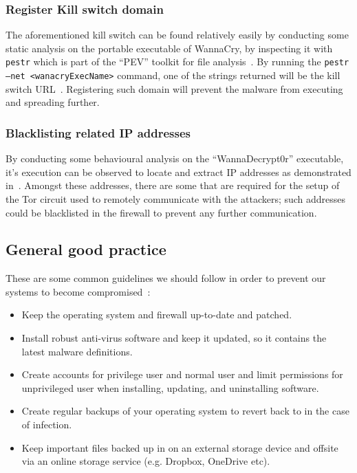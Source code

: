 \documentclass[10pt,a4paper]{article}
\begin{document}
\subsubsection{Register Kill switch domain}
The aforementioned kill switch can be found relatively easily by conducting some static analysis on the portable executable of WannaCry, by inspecting it with \texttt{pestr} which is part of the ``PEV'' toolkit for file analysis~\cite{PEtoolkit}. By running the \texttt{pestr --net <wanacryExecName>} command, one of the strings returned will be the kill switch URL~\cite{pestrVideo}. Registering such domain will prevent the malware from executing and spreading further.

\subsubsection{Blacklisting related IP addresses}
By conducting some behavioural analysis on the ``WannaDecrypt0r'' executable, it's execution can be observed to locate and extract IP addresses as demonstrated in~\cite{wanacryFindIpAddr}. Amongst these addresses, there are some that are required for the setup of the Tor circuit used to remotely communicate with the attackers; such addresses could be blacklisted in the firewall to prevent any further communication.

\subsection{General good practice}
These are some common guidelines we should follow in order to prevent our systems to become compromised~\cite{genernalmitigation}: 
\begin{itemize}
\setlength\itemsep{-0.5em}
\item Keep the operating system and firewall up-to-date and patched.
\item Install robust anti-virus software and keep it updated, so it contains the latest malware definitions.
\item Create accounts for privilege user and normal user and limit permissions for unprivileged user when installing, updating, and uninstalling software.
\item Create regular backups of your operating system to revert back to in the case of infection.
\item Keep important files backed up in on an external storage device and offsite via an online storage service (e.g. Dropbox, OneDrive etc).
\end{itemize}
\end{document}
